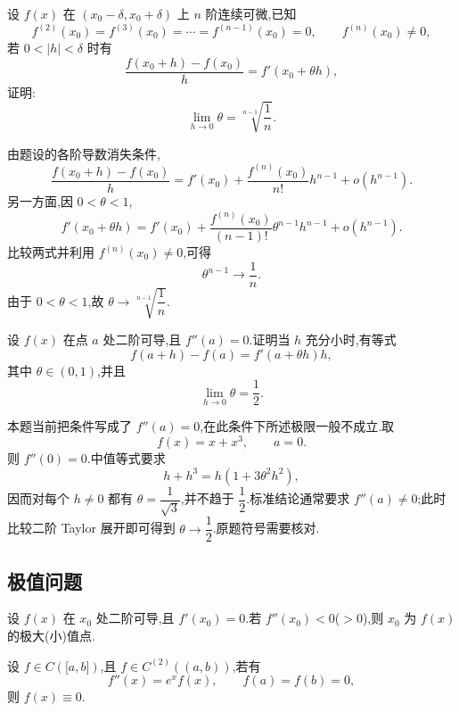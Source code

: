 \begin{example}
    设 $f(x)$ 在 $(x_0-\delta,x_0+\delta)$ 上 $n$ 阶连续可微,已知
    \[
        f^{(2)}(x_0)=f^{(3)}(x_0)=\cdots=f^{(n-1)}(x_0)=0,
        \qquad f^{(n)}(x_0)\neq0,
    \]
    若 $0<|h|<\delta$ 时有
    \[
        \dfrac{f(x_0+h)-f(x_0)}{h}=f'(x_0+\theta h),
    \]
    证明:
    \[
        \displaystyle\lim\limits_{h\to0}\theta
        =\sqrt[n-1]{\dfrac{1}{n}}.
    \]
\end{example}
\exampleblank

\begin{solution}
    由题设的各阶导数消失条件,
    \[
        \dfrac{f(x_0+h)-f(x_0)}{h}
        =f'(x_0)+\dfrac{f^{(n)}(x_0)}{n!}h^{n-1}+o(h^{n-1}).
    \]
    另一方面,因 $0<\theta<1$,
    \[
        f'(x_0+\theta h)
        =f'(x_0)+\dfrac{f^{(n)}(x_0)}{(n-1)!}
        \theta^{n-1}h^{n-1}+o(h^{n-1}).
    \]
    比较两式并利用 $f^{(n)}(x_0)\neq0$,可得
    \[
        \theta^{n-1}\longrightarrow\dfrac{1}{n}.
    \]
    由于 $0<\theta<1$,故 $\theta\to\sqrt[n-1]{\dfrac{1}{n}}$.
\end{solution}

\begin{example}
    设 $f(x)$ 在点 $a$ 处二阶可导,且 $f''(a)=0$.证明当 $h$ 充分小时,有等式
    \[
        f(a+h)-f(a)=f'(a+\theta h)h,
    \]
    其中 $\theta\in(0,1)$,并且
    \[
        \displaystyle\lim\limits_{h\to0}\theta=\dfrac{1}{2}.
    \]
\end{example}
\exampleblank

\begin{solution}
    本题当前把条件写成了 $f''(a)=0$,在此条件下所述极限一般不成立.取
    \[
        f(x)=x+x^3,
        \qquad a=0.
    \]
    则 $f''(0)=0$.中值等式要求
    \[
        h+h^3=h\left(1+3\theta^2h^2\right),
    \]
    因而对每个 $h\neq0$ 都有 $\theta=\dfrac{1}{\sqrt3}$,并不趋于 $\dfrac{1}{2}$.标准结论通常要求 $f''(a)\neq0$;此时比较二阶 Taylor 展开即可得到 $\theta\to\dfrac{1}{2}$.原题符号需要核对.
\end{solution}



\subsection{极值问题}

设 $f(x)$ 在 $x_0$ 处二阶可导,且 $f'(x_0)=0$.若 $f''(x_0)<0$($>0$),则 $x_0$ 为 $f(x)$ 的极大(小)值点.

\begin{example}
    设 $f\in C(\lbrack a,b\rbrack)$,且 $f\in C^{(2)}((a,b))$,若有
    \[
        f''(x)=e^x f(x),\qquad f(a)=f(b)=0,
    \]
    则 $f(x)\equiv0$.
\end{example}
\exampleblank

